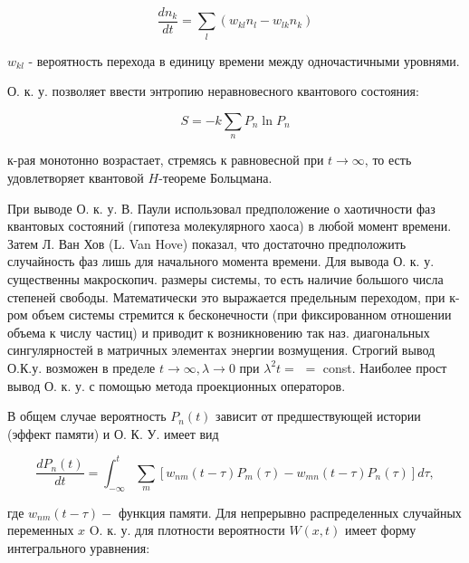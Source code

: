 \documentclass[10pt]{article}
\begin{document}
\[

\frac{d n_{k}}{d t}=\sum_{l}\left(w_{k l} n_{l}-w_{l k} n_{k}\right)

\]



$w_{k l}$ - вероятность перехода в единицу времени между одночастичными уровнями.



О. к. у. позволяет ввести энтропию неравновесного квантового состояния:



\[

S=-k \sum_{n} P_{n} \ln P_{n}

\]



к-рая монотонно возрастает, стремясь к равновесной при $t \rightarrow \infty$, то есть удовлетворяет квантовой $H$-теореме Больцмана.



При выводе О. к. у. В. Паули использовал предположение о хаотичности фаз квантовых состояний (гипотеза молекулярного хаоса) в любой момент времени. Затем Л. Ван Хов (L. Van Hove) показал, что достаточно предположить случайность фаз лишь для начального момента времени. Для вывода О. к. у. существенны макроскопич. размеры системы, то есть наличие большого числа степеней свободы. Математически это выражается предельным переходом, при к-ром объем системы стремится к бесконечности (при фиксированном отношении объема к числу частиц) и приводит к возникновению так наз. диагональных сингулярностей в матричных элементах энергии возмущения. Строгий вывод О.К.у. возможен в пределе $t \rightarrow \infty, \lambda \rightarrow 0$ при $\lambda^{2} t=$ $=$ const. Наиболее прост вывод О. к. у. с помощью метода проекционных операторов.



В общем случае вероятность $P_{n}(t)$ зависит от предшествующей истории (эффект памяти) и О. К. У. имеет вид



\[

\frac{d P_{n}(t)}{d t}=\int_{-\infty}^{t} \sum_{m}\left[w_{n m}(t-\tau) P_{m}(\tau)-w_{m n}(t-\tau) P_{n}(\tau)\right] d \tau,

\]



где $w_{n m}(t-\tau)-$ функция памяти. Для непрерывно распределенных случайных переменных $x$ O. к. у. для плотности вероятности $W(x, t)$ имеет форму интегрального уравнения:
\end{document}
